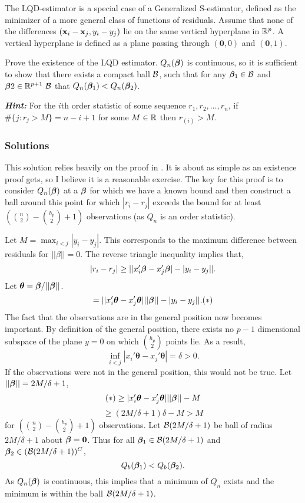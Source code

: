\noindent The LQD-estimator is a special case of a Generalized S-estimator, defined as the minimizer of a more general class of functions of residuals. Assume that none of the differences $(\mathbf{x}_i- \mathbf{x}_j, y_i - y_j)$ lie on the same vertical hyperplane in $\mathbb{R}^p$. A vertical hyperplane is defined as a plane passing through $(\boldsymbol{0},0)$ and $(\boldsymbol{0},1)$.

\noindent Prove the existence of the LQD estimator. $Q_n (\bm{\beta})$ is continuous, so it is sufficient to show that there exists a compact ball $\mathcal{B}$, such that for any $\bm{\beta}_1 \in \mathcal{B}$ and $\bm{\beta}2 \in \mathbb{R}^{p+1} \ \mathcal{B}$ that $Q_n (\bm{\beta}_1) < Q_n (\bm{\beta}_2)$.

\noindent \textbf{\textit{Hint:}} For the $i$th order statistic of some sequence $r_1,r_2,\hdots,r_n$, if $\#\{j:r_j > M\} = n-i+1$ for some $M\in\mathbb{R}$ then $r_{(i)} > M$.

\subsubsection*{Solutions}

This solution relies heavily on the proof in \cite{croux1994generalized}. It is about as simple as an existence proof gets, so I believe it is a reasonable exercise. The key for this proof is to consider $Q_n(\bm{\beta})$ at a $\bm{\beta}$ for which we have a known bound and then construct a ball around this point for which $|r_i - r_j|$ exceeds the bound for at least $(\binom{n}{2} - \binom{h_p}{2} + 1)$ observations (as $Q_n$ is an order statistic).

\noindent Let $M = \max_{i<j} |y_i - y_j|$. This corresponds to the maximum difference between residuals for $||\beta|| = 0$. The reverse triangle inequality implies that,
$$ |r_i - r_j| \geq ||x_i'\bm{\beta} - x_j'\bm{\beta}| - |y_i - y_j||.$$
Let $\boldsymbol{\theta} = \bm{\beta} / ||\bm{\beta}||$.
$$ = ||x_i'\boldsymbol{\theta} - x_j'\boldsymbol{\theta}| ||\bm{\beta}|| - |y_i - y_j||. (*)$$
The fact that the observations are in the general position now becomes important. By definition of the general position, there exists no $p-1$ dimensional subspace of the plane $y=0$ on which $\binom{h_p}{2}$ points lie. As a result, 
$$ \inf_{i<j} |x_i'\boldsymbol{\theta} - x_j'\boldsymbol{\theta}| = \delta > 0. $$
If the observations were not in the general position, this would not be true. Let $||\bm{\beta}|| = 2M/\delta + 1$,
$$ (*) \geq |x_i'\boldsymbol{\theta} - x_j'\boldsymbol{\theta}| ||\bm{\beta}|| - M$$
$$ \geq (2M/\delta + 1)\delta - M > M$$
for $(\binom{n}{2} - \binom{h_p}{2} + 1)$ observations. Let $\mathcal{B}(2M/\delta + 1)$ be ball of radius $2M/\delta + 1$ about $\bm{\beta} = \boldsymbol{0}$. Thus for all $\bm{\beta}_1 \in \mathcal{B}(2M/\delta + 1)$ and $\bm{\beta}_2 \in (\mathcal{B}(2M/\delta + 1))^C$, 
$$Q_b(\bm{\beta}_1) < Q_b(\bm{\beta}_2).$$ 
As $Q_n(\bm{\beta})$ is continuous, this implies that a minimum of $Q_n$ exists and the minimum is within the ball $\mathcal{B}(2M/\delta + 1)$.